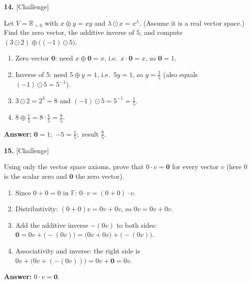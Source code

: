 \documentclass[11pt]{article}
\begin{document}
\begin{minipage}{\linewidth}\textbf{14.} \hfill{\scriptsize\color{ink}[Challenge]}\par\nopagebreak Let $V=\mathbb{R}_{>0}$ with $x\oplus y=xy$ and $\lambda\odot x=x^{\lambda}$. (Assume it is a real vector space.) Find the zero vector, the additive inverse of $5$, and compute $(3\odot2)\oplus\big((-1)\odot5\big)$.
\end{minipage}\par\nopagebreak
\begin{tcolorbox}[breakable,colback=ans,colframe=ansb,boxrule=0.5pt,left=4pt,right=4pt,top=2pt,bottom=2pt]\begin{enumerate}[leftmargin=2.2em,itemsep=1pt,topsep=1pt,label=\textbf{Step \arabic*.}]\item Zero vector $\mathbf 0$: need $x\oplus\mathbf 0=x$, i.e.\ $x\cdot\mathbf 0=x$, so $\mathbf 0=1$.
\item Inverse of $5$: need $5\oplus y=1$, i.e.\ $5y=1$, so $y=\tfrac15$ (also equals $(-1)\odot5=5^{-1}$).
\item $3\odot2=2^{3}=8$ and $(-1)\odot5=5^{-1}=\tfrac15$.
\item $8\oplus\tfrac15=8\cdot\tfrac15=\tfrac85$.
\end{enumerate}\textbf{Answer:} $\mathbf 0=1$;\ $-5=\tfrac15$;\ result $\tfrac85$.\end{tcolorbox}
\par\vspace{2pt}
\begin{minipage}{\linewidth}\textbf{15.} \hfill{\scriptsize\color{ink}[Challenge]}\par\nopagebreak Using only the vector space axioms, prove that $0\cdot v=\mathbf 0$ for every vector $v$ (here $0$ is the scalar zero and $\mathbf 0$ the zero vector).
\end{minipage}\par\nopagebreak
\begin{tcolorbox}[breakable,colback=ans,colframe=ansb,boxrule=0.5pt,left=4pt,right=4pt,top=2pt,bottom=2pt]\begin{enumerate}[leftmargin=2.2em,itemsep=1pt,topsep=1pt,label=\textbf{Step \arabic*.}]\item Since $0+0=0$ in $\mathbb{F}$: $0\cdot v=(0+0)\cdot v$.
\item Distributivity: $(0+0)v=0v+0v$, so $0v=0v+0v$.
\item Add the additive inverse $-(0v)$ to both sides: $\mathbf 0=0v+\big(-(0v)\big)=\big(0v+0v\big)+\big(-(0v)\big)$.
\item Associativity and inverse: the right side is $0v+\big(0v+(-(0v))\big)=0v+\mathbf 0=0v$.
\end{enumerate}\textbf{Answer:} $0\cdot v=\mathbf 0$.\end{tcolorbox}
\end{document}
